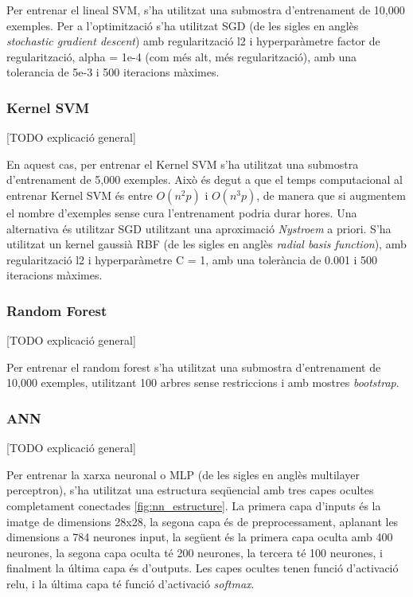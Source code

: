 \documentclass[12pt, spanish]{article}
\begin{document}
Per entrenar el lineal SVM, s'ha utilitzat una submostra d'entrenament de 10,000 exemples. Per a l'optimització s'ha utilitzat SGD (de les sigles en anglès \textit{stochastic gradient descent}) amb regularització l2 i hyperparàmetre factor de regularització, alpha = 1e-4 (com més alt, més regularització), amb una tolerancia de 5e-3 i 500 iteracions màximes.

\subsubsection{Kernel SVM}

[TODO explicació general]

En aquest cas, per entrenar el Kernel SVM s'ha utilitzat una submostra d'entrenament de 5,000 exemples. Això és degut a que el temps computacional al entrenar Kernel SVM és entre $O(n^2 p)$  i $O(n^3 p)$, de manera que si augmentem el nombre d'exemples sense cura l'entrenament podria durar hores. Una alternativa és utilitzar SGD utilitzant una aproximació \textit{Nystroem} a priori. S'ha utilitzat un kernel gaussià RBF (de les sigles en anglès \textit{radial basis function}), amb regularització l2 i hyperparàmetre C = 1, amb una tolerància de 0.001 i 500 iteracions màximes. 

\subsubsection{Random Forest}

[TODO explicació general]

Per entrenar el random forest s'ha utilitzat una submostra d'entrenament de 10,000 exemples, utilitzant 100 arbres sense restriccions i amb mostres \textit{bootstrap}. 

\subsubsection{ANN}

[TODO explicació general]

Per entrenar la xarxa neuronal o MLP (de les sigles en anglès multilayer perceptron), s'ha utilitzat una estructura seqüencial amb tres capes ocultes completament conectades \ref{fig:nn_estructure}. La primera capa d'inputs és la imatge de dimensions 28x28, la segona capa és de preprocessament, aplanant les dimensions a 784 neurones input, la següent és la primera capa oculta amb 400 neurones, la segona capa oculta té 200 neurones, la tercera té 100 neurones, i finalment la última capa és d'outputs. Les capes ocultes tenen funció d'activació relu, i la última capa té funció d'activació \textit{softmax}. 
\end{document}
